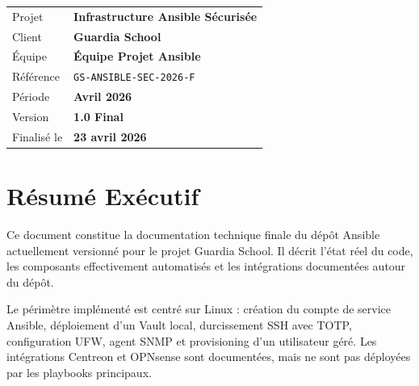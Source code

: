 \documentclass[11pt,a4paper]{article}
\begin{document}
\begin{titlepage}
  \hspace*{1.2cm}
  \begin{minipage}{0.75\textwidth}
    \begin{tcolorbox}[
      enhanced,
      colback=white,
      colframe=BorderGray,
      boxrule=0.8pt,
      arc=8pt,
      left=14pt,right=14pt,top=12pt,bottom=12pt
    ]
    \renewcommand{\arraystretch}{1.5}
    \begin{tabular}{@{} L{3.8cm} L{6cm} @{}}
      \textcolor{MediumGray}{\small Projet} & \textbf{Infrastructure Ansible Sécurisée} \\
      \textcolor{MediumGray}{\small Client} & \textbf{Guardia School} \\
      \textcolor{MediumGray}{\small Équipe} & \textbf{Équipe Projet Ansible} \\
      \textcolor{MediumGray}{\small Référence} & \texttt{\small GS-ANSIBLE-SEC-2026-F} \\
      \textcolor{MediumGray}{\small Période} & \textbf{Avril 2026} \\
      \textcolor{MediumGray}{\small Version} & \textbf{1.0 Final} \\
      \textcolor{MediumGray}{\small Finalisé le} & \textbf{23 avril 2026} \\
    \end{tabular}
    \end{tcolorbox}
  \end{minipage}

  \vfill
\end{titlepage}
\hypersetup{pageanchor=true}

\clearpage
\renewcommand{\contentsname}{\textcolor{PrimaryBlue}{Sommaire}}
{
\tableofcontents
}

\clearpage

\section{Résumé Exécutif}

Ce document constitue la documentation technique finale du dépôt Ansible actuellement versionné pour le projet Guardia School. Il décrit l'état réel du code, les composants effectivement automatisés et les intégrations documentées autour du dépôt.

Le périmètre implémenté est centré sur Linux : création du compte de service Ansible, déploiement d'un Vault local, durcissement SSH avec TOTP, configuration UFW, agent SNMP et provisioning d'un utilisateur géré. Les intégrations Centreon et OPNsense sont documentées, mais ne sont pas déployées par les playbooks principaux.
\end{document}
